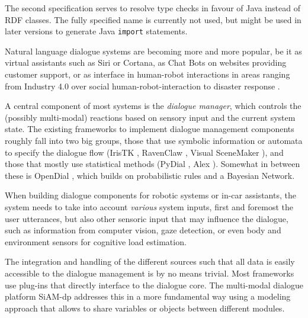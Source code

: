 The second specification serves to resolve type checks in favour of Java
instead of RDF classes. The fully specified name is currently not used, but
might be used in later versions to generate Java \texttt{import} statements.


Natural language dialogue systems are becoming more and more popular, be it as
virtual assistants such as Siri or Cortana, as Chat Bots on websites providing
customer support, or as interface in human-robot interactions in areas ranging
from Industry 4.0 \citep{schwartz2016hybrid} over social human-robot-interaction
\citep{alize2010} to disaster response \citep{kruijff2015tradr}.

A central component of most systems is the \emph{dialogue manager}, which
controls the (possibly multi-modal) reactions based on sensory input and the
current system state. The existing frameworks to implement dialogue management
components roughly fall into two big groups, those that use symbolic
information or automata to specify the dialogue flow (IrisTK
\citep{2012iristk}, RavenClaw \citep{bohus2009ravenclaw}, Visual SceneMaker
\citep{gebhard2012visual}), and those that mostly use statistical methods
(PyDial \cite{ultes2017pydial}, Alex \citep{jurvcivcek2014alex}). Somewhat in
between these is OpenDial \citep{lison2015developing}, which builds on
probabilistic rules and a Bayesian Network.

When building dialogue components for robotic systems or in-car assistants, the system
needs to take into account \emph{various} system inputs, first and foremost the
user utterances, but also other sensoric input that may influence the dialogue,
such as information from computer vision, gaze detection, or even body and
environment sensors for cognitive load estimation.

The integration and handling of the different sources such that all data is
easily accessible to the dialogue management is by no means trivial. Most
frameworks use plug-ins that directly interface to the dialogue core. The
multi-modal dialogue platform SiAM-dp \citep{nesselrath2014siam}
addresses this in a more fundamental way using a modeling approach that allows
to share variables or objects between different modules.

